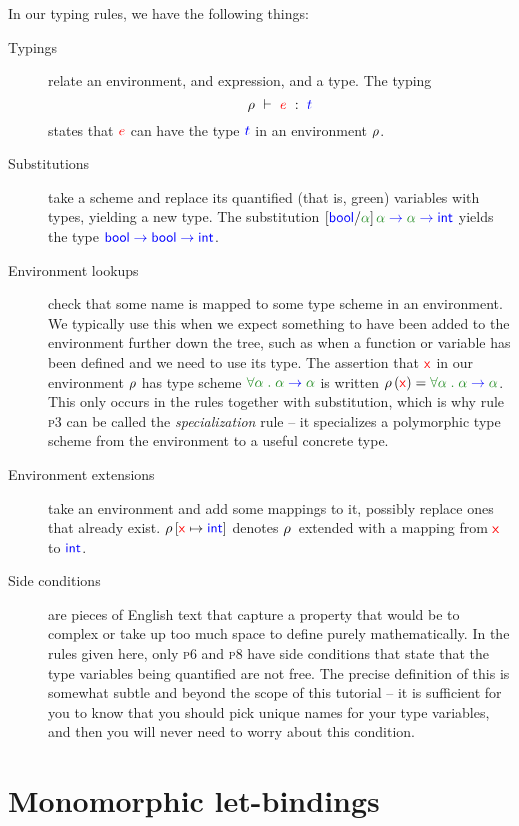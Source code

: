 \documentclass[a4paper]{article}
\newcommand{\RULE}[1]{\textsc{#1}}
\newcommand{\SUBST}[2]{\left[#1\right]#2}
\newcommand{\expr}[1]{\ensuremath{\textcolor{term}{#1}}}
\newcommand{\type}[1]{\ensuremath{\textcolor{blue}{#1}}}
\newcommand{\context}[1]{\ensuremath{\textcolor{black}{#1}}}
\newcommand{\scheme}[1]{\ensuremath{\textcolor{ForestGreen}{#1}}}
\newcommand{\const}[1]{\mathsf{#1}}
\newcommand{\typing}[3]{\ensuremath{#1\ \vdash\ #2\ :\ #3}}
\newcommand\var[1]{\ensuremath{\expr{\mathsf{#1}}}}
\newcommand\INT{\type{\const{int}}}
\newcommand\BOOL{\type{\const{bool}}}
\newcommand{\fn}[2]{#1\;\type{\to}\;#2}
\newcommand\FORALL[2]{\scheme{\forall #1\;.\;#2}}
\newcommand{\WITH}[2]{\context{#1\left[#2\right]}}
\newcommand{\RHO}{\context{\rho}}
\newcommand{\LOOKUP}[2]{#1\left(#2\right)}
\begin{document}
In our typing rules, we have the following things:
\begin{description}
\item[Typings] relate an environment, and expression, and a type. The typing \[\typing{\RHO}{\expr{e}}{\type{t}}\] states that $\expr{e}$ can have the type $\type{t}$ in an environment $\RHO$.
\item[Substitutions] take a scheme and replace its quantified (that is, green) variables with
  types, yielding a new type. The substitution $\SUBST{\type{\BOOL}/\scheme{\alpha}}{\fn{\fn{\scheme{\alpha}}{\scheme{\alpha}}}{\INT}}$ yields the type $\type{\fn{\fn{\BOOL}{\BOOL}}{\INT}}$.
\item[Environment lookups] check that some name is mapped to some type scheme
  in an environment. We typically use this when we expect something to have
  been added to the environment further down the tree, such as when a function
  or variable has been defined and we need to use its type. The assertion that
  $\var{x}$ in our environment $\RHO$ has type scheme $\FORALL{\alpha}{\fn{\scheme{\alpha}}{\scheme{\alpha}}}$ is written $\LOOKUP{\RHO}{\var{x}} = \FORALL{\alpha}{\fn{\scheme{\alpha}}{\scheme{\alpha}}}$. This only occurs in the rules together with substitution, which is why rule \RULE{p3} can be called the \emph{specialization} rule -- it specializes a polymorphic type scheme from the environment to a useful concrete type.
\item[Environment extensions] take an environment and add some mappings to it,
  possibly replace ones that already exist. $\WITH{\RHO}{\var{x}\mapsto\INT}$
  denotes \RHO\ extended with a mapping from $\var{x}$ to \INT.
\item[Side conditions] are pieces of English text that capture a property that
  would be to complex or take up too much space to define purely
  mathematically. In the rules given here, only \RULE{p6} and \RULE{p8} have
  side conditions that state that the type variables being quantified are not
  free. The precise definition of this is somewhat subtle and beyond the scope
  of this tutorial -- it is sufficient for you to know that you should pick
  unique names for your type variables, and then you will never need to worry
  about this condition.
\end{description}

\section{Monomorphic let-bindings}
\label{sec:monom-let-bind}
\end{document}

